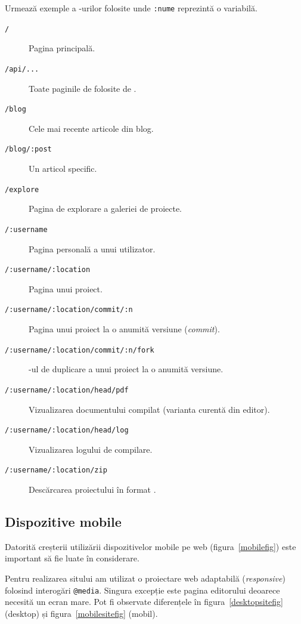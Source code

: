 \documentclass[a4wide,12pt]{report}
\newcommand{\eng}[1]{\emph{#1}} %
\newcommand{\cod}[1]{\texttt{#1}}
\newcommand{\acr}[1]{{\textsmaller[1]{\textsc{#1}}}} %
\begin{document}
Urmează exemple a \acr{URL}-urilor folosite unde \cod{:nume} reprezintă o
variabilă.

\begin{description}

\item[\cod{/}] Pagina principală.

\item[\cod{/api/...}] Toate paginile de folosite de \acr{API}.

\item[\cod{/blog}] Cele mai recente articole din blog.

\item[\cod{/blog/:post}] Un articol specific.

\item[\cod{/explore}] Pagina de explorare a galeriei de proiecte.

\item[\cod{/:username}] Pagina personală a unui utilizator.

\item[\cod{/:username/:location}] Pagina unui proiect.

\item[\cod{/:username/:location/commit/:n}] Pagina unui proiect la o anumită
versiune (\eng{commit}).

\item[\cod{/:username/:location/commit/:n/fork}] \acr{URL}-ul de duplicare a
unui proiect la o anumită versiune.

\item[\cod{/:username/:location/head/pdf}] Vizualizarea documentului compilat
(varianta curentă din editor).

\item[\cod{/:username/:location/head/log}] Vizualizarea logului de compilare.

\item[\cod{/:username/:location/zip}] Descărcarea proiectului în format \acr{ZIP}.

\end{description}

\subsection{Dispozitive mobile}

Datorită creșterii utilizării dispozitivelor mobile pe web
(figura~\ref{mobilefig}) este important să fie luate în considerare.

Pentru realizarea sitului am utilizat o proiectare web adaptabilă
(\eng{responsive}) folosind interogări \cod{@media}. Singura excepție este
pagina editorului deoarece necesită un ecran mare. Pot fi observate diferențele
în figura~\ref{desktopsitefig} (desktop) și figura~\ref{mobilesitefig} (mobil).
\end{document}
